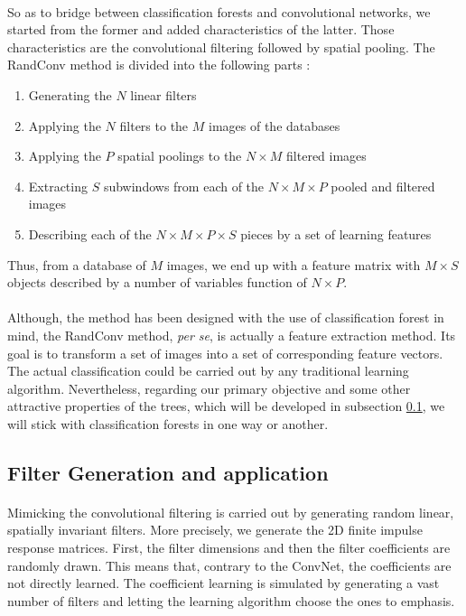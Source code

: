 \documentclass[a4paper]{report}
\begin{document}
	\paragraph{}
	So as to bridge between classification forests and convolutional networks, we started from the former and added characteristics of the latter. Those characteristics are the convolutional filtering followed by spatial pooling.
	The RandConv method is divided into the following parts :
	
	\begin{enumerate}
		\item Generating the $N$ linear filters
		\item Applying the $N$ filters to the $M$ images of the databases
		\item Applying the $P$ spatial poolings to the $N \times M$ filtered images
		\item Extracting $S$ subwindows from each of the $N \times M \times P$ pooled and filtered images
		\item Describing each of the $N \times M \times P \times S$ pieces by a set of learning features
	\end{enumerate}
	
	Thus, from a database of $M$ images, we end up with a feature matrix with $M \times S$ objects described by a number of variables
	function of $N \times P$.
	
	\paragraph{}
	Although, the method has been designed with the use of classification forest in mind, the RandConv method, \textit{per se}, is actually a feature extraction method. Its goal is to transform a set of images into a set of corresponding feature vectors. The actual classification could be carried out by any traditional learning algorithm. Nevertheless, regarding our primary objective and some other attractive properties of the trees, which will be developed in subsection \ref{subsec:methodo-filtergen}, we will stick with classification forests in one way or another.


	
		\subsection{Filter Generation and application}\label{subsec:methodo-filtergen}
		\paragraph{}
		Mimicking the convolutional filtering is carried out by generating random linear, spatially invariant filters. More precisely, we generate the 2D finite impulse response matrices. First, the filter dimensions and then the filter coefficients are randomly drawn. This means that, contrary to the ConvNet, the coefficients are not directly learned. The coefficient learning is simulated by generating a vast number of filters and letting the learning algorithm choose the ones to emphasis. 
\end{document}
